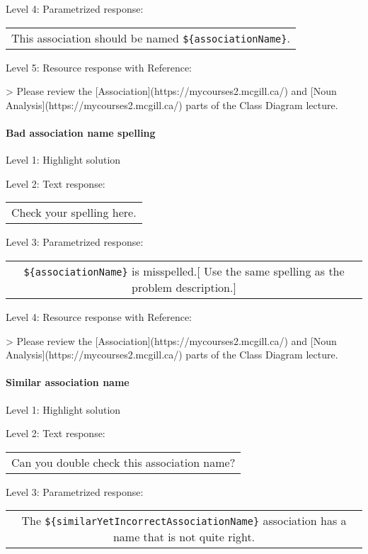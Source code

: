 \noindent Level 4: Parametrized response: \medskip

\begin{tabular}{|c}
This association should be named \verb|${associationName}|.
\end{tabular} \medskip

\noindent Level 5: Resource response with Reference:

> Please review the [Association](https://mycourses2.mcgill.ca/) and [Noun Analysis](https://mycourses2.mcgill.ca/) parts of the Class Diagram lecture.


\paragraph{Bad association name spelling}

\noindent Level 1: Highlight solution \medskip

\noindent Level 2: Text response: \medskip

\begin{tabular}{|c}
Check your spelling here.
\end{tabular} \medskip

\noindent Level 3: Parametrized response: \medskip

\begin{tabular}{|c}
\verb|${associationName}| is misspelled.[ Use the same spelling as the problem description.]
\end{tabular} \medskip

\noindent Level 4: Resource response with Reference:

> Please review the [Association](https://mycourses2.mcgill.ca/) and [Noun Analysis](https://mycourses2.mcgill.ca/) parts of the Class Diagram lecture.


\paragraph{Similar association name}

\noindent Level 1: Highlight solution \medskip

\noindent Level 2: Text response: \medskip

\begin{tabular}{|c}
Can you double check this association name?
\end{tabular} \medskip

\noindent Level 3: Parametrized response: \medskip

\begin{tabular}{|c}
The \verb|${similarYetIncorrectAssociationName}| association has a name that is not quite right.
\end{tabular} \medskip

